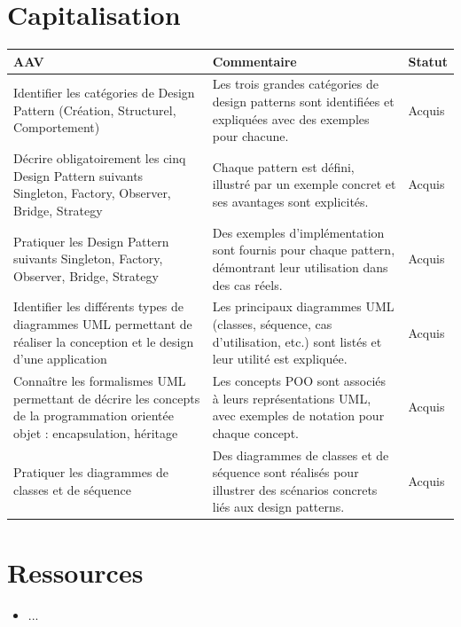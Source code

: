 \newpage

\section*{Capitalisation}

\begin{center}
\setlength{\tabcolsep}{10pt}

\begin{tabular}{|p{}|p{}|m{}|}
\hline
\textbf{AAV} & \textbf{Commentaire} & \textbf{Statut} \\ \hline

Identifier les catégories de Design Pattern (Création, Structurel, Comportement) &
Les trois grandes catégories de design patterns sont identifiées et expliquées avec des exemples pour chacune. &
{\color{green!60!black}Acquis} \\ \hline

Décrire obligatoirement les cinq Design Pattern suivants Singleton, Factory, Observer, Bridge, Strategy &
Chaque pattern est défini, illustré par un exemple concret et ses avantages sont explicités. &
{\color{green!60!black}Acquis} \\ \hline

Pratiquer les Design Pattern suivants Singleton, Factory, Observer, Bridge, Strategy &
Des exemples d’implémentation sont fournis pour chaque pattern, démontrant leur utilisation dans des cas réels. &
{\color{green!60!black}Acquis} \\ \hline

Identifier les différents types de diagrammes UML permettant de réaliser la conception et le design d'une application &
Les principaux diagrammes UML (classes, séquence, cas d’utilisation, etc.) sont listés et leur utilité est expliquée. &
{\color{green!60!black}Acquis} \\ \hline

Connaître les formalismes UML permettant de décrire les concepts de la programmation orientée objet : encapsulation, héritage &
Les concepts POO sont associés à leurs représentations UML, avec exemples de notation pour chaque concept. &
{\color{green!60!black}Acquis} \\ \hline

Pratiquer les diagrammes de classes et de séquence &
Des diagrammes de classes et de séquence sont réalisés pour illustrer des scénarios concrets liés aux design patterns. &
{\color{green!60!black}Acquis} \\ \hline

\end{tabular}
\end{center}

\newpage

\section*{Ressources}

\begin{itemize}
	\item ...
\end{itemize}
